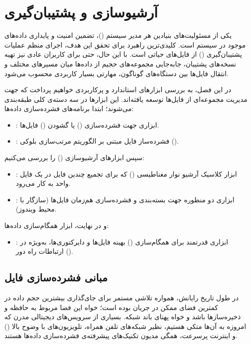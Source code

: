 \chapter{آرشیو‌سازی و پشتیبان‌گیری}

یکی از مسئولیت‌های بنیادین هر مدیر سیستم ()، تضمین امنیت و پایداری داده‌های موجود در سیستم است. کلیدی‌ترین راهبرد برای تحقق این هدف، اجرای منظم عملیات پشتیبان‌گیری () از فایل‌های حیاتی است. با این حال، حتی برای کاربران عادی نیز تهیه نسخه‌های پشتیبان، جابه‌جایی مجموعه‌های حجیم از داده‌ها میان مسیرهای مختلف و انتقال فایل‌ها بین دستگاه‌های گوناگون، مهارتی بسیار کاربردی محسوب می‌شود.

در این فصل، به بررسی ابزارهای استاندارد و پرکاربردی خواهیم پرداخت که جهت مدیریت مجموعه‌ای از فایل‌ها توسعه یافته‌اند. این ابزارها در سه دسته‌ی کلی طبقه‌بندی می‌شوند؛ ابتدا برنامه‌های فشرده‌سازی داده‌ها:

\begin{itemize}
  \item {}: ابزاری جهت فشرده‌سازی () یا گشودن () فایل‌ها.
  \item {}: فشرده‌ساز فایل مبتنی بر الگوریتم مرتب‌سازی بلوکی ().
\end{itemize}

سپس ابزارهای آرشیو‌سازی () را بررسی می‌کنیم:

\begin{itemize}
  \item {}: ابزار کلاسیک آرشیو نوار مغناطیسی () که برای تجمیع چندین فایل در یک فایل واحد به کار می‌رود.
  \item {}: ابزاری دو منظوره جهت بسته‌بندی و فشرده‌سازی هم‌زمان فایل‌ها (سازگار با محیط ویندوز).
\end{itemize}

و در نهایت، ابزار همگام‌سازی داده‌ها:

\begin{itemize}
  \item {}: ابزاری قدرتمند برای همگام‌سازی () بهینه فایل‌ها و دایرکتوری‌ها، به‌ویژه در ارتباطات راه دور ().
\end{itemize}

\section{مبانی فشرده‌سازی فایل}

در طول تاریخ رایانش، همواره تلاشی مستمر برای جای‌گذاری بیشترین حجم داده در کمترین فضای ممکن در جریان بوده است؛ خواه این فضا مربوط به حافظه و ذخیره‌سازها باشد و خواه پهنای باند شبکه. بسیاری از سرویس‌های دیجیتالی مدرن که امروزه به آن‌ها متکی هستیم، نظیر شبکه‌های تلفن همراه، تلویزیون‌های با وضوح بالا () و اینترنت پرسرعت، همگی مدیون تکنیک‌های پیشرفته‌ی فشرده‌سازی داده‌ها هستند.

